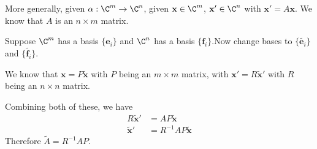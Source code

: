 \documentclass[a4paper]{article}
\begin{document}
More generally, given $\alpha: \C^m \to \C^n$, given $\mathbf{x}\in \C^m$, $\mathbf{x}'\in \C^n$ with $\mathbf{x}' = A\mathbf{x}$. We know that $A$ is an $n\times m$ matrix.

Suppose $\C^m$ has a basis $\{\mathbf{e}_i\}$ and $\C^n$ has a basis $\{\mathbf{f}_i\}$.Now change bases to $\{\tilde{\mathbf{e}_i}\}$ and $\{\tilde{\mathbf{f}_i}\}$.

We know that $\mathbf{x} = P\mathbf{\tilde{x}}$ with $P$ being an $m\times m$ matrix, with $\mathbf{x}' = R\tilde{\mathbf{x}}'$ with $R$ being an $n\times n$ matrix.

Combining both of these, we have
\begin{align*}
  R\tilde{\mathbf{x}}' &= AP\tilde{\mathbf{x}}\\
  \tilde{\mathbf{x}}' &= R^{-1}AP\mathbf{\tilde{x}}
\end{align*}
Therefore $\tilde{A} = R^{-1}AP$.
\end{document}
